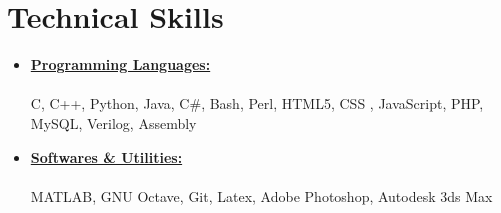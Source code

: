 \documentclass{cv}
\begin{document}
\section*{Technical Skills}
\begin{itemize}
\item \textbf{\underline{Programming Languages:}} \\ \\
C, C++, Python, Java, C\#, Bash, Perl, HTML5, CSS , JavaScript, PHP, MySQL, Verilog, Assembly
\item \textbf{\underline{Softwares \& Utilities:}} \\ \\
MATLAB, GNU Octave, Git, Latex, Adobe Photoshop, Autodesk 3ds Max
\end{itemize}
\end{document}
